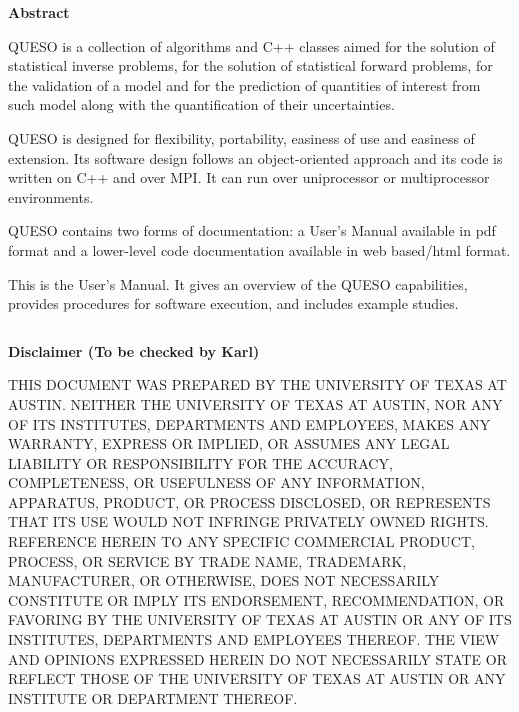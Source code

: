 \clearpage
\centerline{\Large\bf Abstract}
$~$\\
QUESO is a collection of algorithms and C++ classes aimed
for the solution of statistical inverse problems, for the solution of
statistical forward problems, for the validation of a model and for
the prediction of quantities of interest from such model along with
the quantification of their uncertainties.

QUESO is designed for flexibility, portability, easiness of use and
easiness of extension. Its software design follows an object-oriented
approach and its code is written on C++ and over MPI. It can run over
uniprocessor or multiprocessor environments.

QUESO contains two forms of documentation:
a User's Manual available in pdf format
and
a lower-level code documentation available in web based/html format.

This is the User's Manual.
It gives an overview of the QUESO capabilities,
provides procedures for software execution, and includes example studies.

\clearpage
$~$\\

\clearpage
\centerline{\Large\bf Disclaimer (To be checked by Karl)}
$~$\\
    THIS DOCUMENT WAS PREPARED
    BY THE UNIVERSITY OF TEXAS AT AUSTIN.
    NEITHER THE UNIVERSITY OF TEXAS
    AT AUSTIN, NOR ANY OF ITS INSTITUTES, DEPARTMENTS AND EMPLOYEES, MAKES ANY WARRANTY, EXPRESS OR IMPLIED,
    OR ASSUMES ANY LEGAL LIABILITY OR RESPONSIBILITY FOR THE ACCURACY, COMPLETENESS, OR
    USEFULNESS OF ANY INFORMATION, APPARATUS, PRODUCT, OR PROCESS DISCLOSED, OR REPRESENTS
    THAT ITS USE WOULD NOT INFRINGE PRIVATELY OWNED RIGHTS. REFERENCE HEREIN TO ANY SPECIFIC
    COMMERCIAL PRODUCT, PROCESS, OR SERVICE BY TRADE NAME, TRADEMARK, MANUFACTURER, OR OTHERWISE,
    DOES NOT NECESSARILY CONSTITUTE OR IMPLY ITS ENDORSEMENT, RECOMMENDATION, OR FAVORING BY
    THE UNIVERSITY OF TEXAS AT AUSTIN OR ANY OF ITS INSTITUTES, DEPARTMENTS AND EMPLOYEES THEREOF.
    THE VIEW AND OPINIONS EXPRESSED HEREIN DO NOT NECESSARILY STATE OR REFLECT
    THOSE OF THE UNIVERSITY OF TEXAS AT AUSTIN OR ANY INSTITUTE OR DEPARTMENT
    THEREOF.

